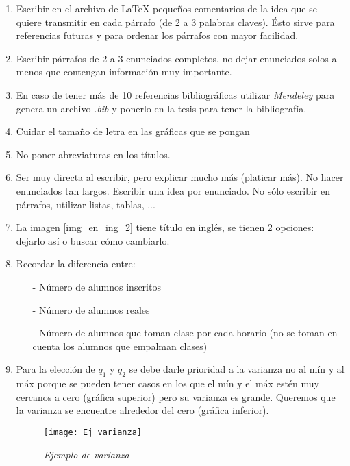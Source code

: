 \begin{appendices}
\begin{enumerate}
  \item Escribir en el archivo de LaTeX pequeños comentarios de la idea que se quiere transmitir en cada párrafo (de 2 a 3 palabras claves). Ésto sirve para referencias futuras y para ordenar los párrafos con mayor facilidad.
  
  \item Escribir párrafos de 2 a 3 enunciados completos, no dejar enunciados solos a menos que contengan información muy importante.
  
  \item En caso de tener más de 10 referencias bibliográficas utilizar \textit{Mendeley} para genera un archivo \textit{.bib} y  ponerlo en la tesis para tener la bibliografía.
  
  \item Cuidar el tamaño de letra en las gráficas que se pongan
  
  \item No poner abreviaturas en los títulos.
  
  \item Ser muy directa al escribir, pero explicar mucho más (platicar más). No hacer enunciados tan largos. Escribir una idea por enunciado. No sólo escribir en párrafos, utilizar listas, tablas, ...
  
  \item La imagen \ref{img_en_ing_2} tiene título en inglés, se tienen 2 opciones: dejarlo así o buscar cómo cambiarlo.
  
  \item Recordar la diferencia entre:
  \begin{itemize}
  	\item[-] Número de alumnos inscritos
  	
  	\item[-] Número de alumnos reales
  	
  	\item[-] Número de alumnos que toman clase por cada horario (no se toman en cuenta los alumnos que empalman clases)
  \end{itemize}
  
  \item Para la elección de $q_{1}$ y $q_{2}$ se debe darle prioridad a la varianza no al mín y al máx porque se pueden tener casos en los que el mín y el máx estén muy cercanos a cero (gráfica superior) pero su varianza es grande. Queremos que la varianza se encuentre alrededor del cero (gráfica inferior).

\begin{figure}[H]
\centering
\texttt{[image: Ej\_varianza]} %
\caption{\textit{Ejemplo de varianza}}
\end{figure}
  

\end{enumerate}
\end{appendices}
